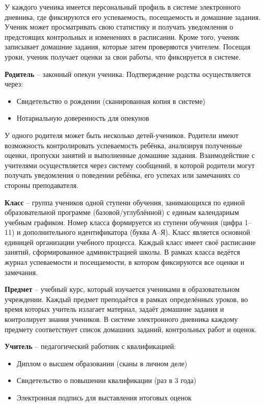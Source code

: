 \documentclass[a4paper, final]{article}
\begin{document}
У каждого ученика имеется персональный профиль в системе электронного дневника, где фиксируются его успеваемость, посещаемость и домашние задания. Ученик может просматривать свою статистику и получать уведомления о предстоящих контрольных и изменениях в расписании. Кроме того, ученик записывает домашние задания, которые затем проверяются учителем. Посещая уроки, ученик получает оценки за свои работы, что фиксируется в системе.

\textbf{Родитель} -- законный опекун ученика. Подтверждение родства осуществляется через:
\begin{itemize}
  \item Свидетельство о рождении (сканированная копия в системе)
  \item Нотариальную доверенность для опекунов
\end{itemize}

У одного родителя может быть несколько детей-учеников. Родители имеют возможность контролировать успеваемость ребёнка, анализируя полученные оценки, пропуски занятий и выполненные домашние задания. Взаимодействие с учителями осуществляется через систему сообщений, в которой родители могут получать уведомления о поведении ребёнка, его успехах или замечаниях со стороны преподавателя.

\textbf{Класс} -- группа учеников одной ступени обучения, занимающихся по единой образовательной программе (базовой/углублённой) с единым календарным учебным графиком. Номер класса формируется из ступени обучения (цифра 1--11) и дополнительного идентификатора (буква А--Я). Класс является основной единицей организации учебного процесса. Каждый класс имеет своё расписание занятий, сформированное администрацией школы. В рамках класса ведётся журнал успеваемости и посещаемости, в котором фиксируются все оценки и замечания.

\textbf{Предмет} -- учебный курс, который изучается учениками в образовательном учреждении. Каждый предмет преподаётся в рамках определённых уроков, во время которых учитель излагает материал, задаёт домашние задания и контролирует знания учеников. В системе электронного дневника каждому предмету соответствует список домашних заданий, контрольных работ и оценок.

\textbf{Учитель} -- педагогический работник с квалификацией:
\begin{itemize}
  \item Диплом о высшем образовании (сканы в личном деле)
  \item Свидетельство о повышении квалификации (раз в 3 года)
  \item Электронная подпись для выставления итоговых оценок
\end{itemize}
\end{document}
